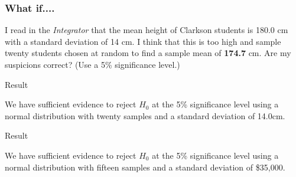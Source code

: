 \begin{frame}
  \frametitle{What if....}


  I read in the \textit{Integrator} that the mean height of Clarkson
  students is 180.0 cm with a standard deviation of 14 cm. I think
  that this is too high and sample twenty students chosen at random to
  find a sample mean of \textbf{174.7} cm. Are my suspicions correct?
  (Use a 5\% significance level.)

    \vfill
    

\end{frame}


\begin{frame}{Result}

  We have sufficient evidence to reject $H_0$ at the 5\% significance
  level using a normal distribution with twenty samples and a standard
  deviation of 14.0cm.
  
\end{frame}






\begin{frame}{Result}

  We have sufficient evidence to reject $H_0$ at the 5\% significance
  level using a normal distribution with fifteen samples and a standard
  deviation of \$35,000.
  
\end{frame}


